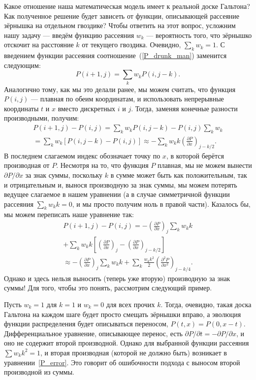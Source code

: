 \documentclass{book}
\begin{document}
Какое отношение наша математическая модель имеет к реальной доске Гальтона? Как полученное решение
будет зависеть от функции, описывающей рассеяние зёрнышка на отдельном гвоздике? Чтобы ответить на
этот вопрос, усложним нашу задачу --- введём функцию рассеяния $w_k$ --- вероятность того, что
зёрнышко отскочит на расстояние $k$ от текущего гвоздика. Очевидно, $\sum_k w_k = 1$. С введением
функции рассеяния соотношение~(\ref{P_drunk_man}) заменится следующим:
\begin{equation}
    \label{advanced_drunk_man}
    P(i+1, j) = \sum_k w_k P(i, j - k).
\end{equation}
Аналогично тому, как мы это делали ранее, мы можем считать, что функция $P(i, j)$ --- плавная по
обеим координатам, и использовать непрерывные координаты $t$ и $x$ вместо дискретных $i$ и $j$.
Тогда, заменяя конечные разности производными, получим:
\begin{multline}
    P(i + 1, j) - P(i, j) = \sum_k w_k P(i, j - k) - P(i, j) \sum_k w_k \\
    = \sum_k w_k \left[ P(i, j - k) - P(i, j) \right] \approx - \sum_k w_k k \left( \frac{\partial
    P}{\partial x} \right)_{j - k/2}.
\end{multline}
В последнем слагаемом индекс обозначает точку по $x$, в которой берётся производная от $P$.
Несмотря на то, что функция $P$ плавная, мы не можем вынести $\partial P / \partial x$ за знак
суммы, поскольку $k$ в сумме может быть как положительным, так и отрицательным и, вынося
производную за знак суммы, мы можем потерять ведущее слагаемое в нашем уравнении (а в
случае симметричной функции рассеяния $\sum_k w_k k = 0$, и мы просто получим ноль в правой части).
Казалось бы, мы можем переписать наше уравнение так:
\begin{multline}
    \label{P_error}
    P(i + 1, j) - P(i, j) = -\left( \frac{\partial P}{\partial x} \right)_j \sum_k w_k k \\
    + \sum_k w_k k \left[ \left( \frac{\partial P}{\partial x} \right)_j - \left( \frac{\partial
    P}{\partial x} \right)_{j - k/2} \right] \\
    \approx - \left( \frac{\partial P}{\partial x} \right)_j \sum_k w_k k + \sum_k \frac{w_k
    k^2}{2} \left( \frac{\partial^2 P}{\partial x^2} \right)_{j - k/4}.
\end{multline}
Однако и здесь нельзя выносить (теперь уже вторую) производную за знак суммы! Для того, чтобы это
понять, рассмотрим следующий пример.

Пусть $w_k = 1$ для $k = 1$ и $w_k = 0$ для всех прочих $k$. Тогда, очевидно, такая доска Гальтона
на каждом шаге будет просто смещать зёрнышки вправо, а эволюция функции распределения будет
описываться переносом, $P(t, x) = P(0, x - t)$. Дифференциальное уравнение, описывающее перенос,
есть $\partial P / \partial t = -\partial P / \partial x$, и оно не содержит второй производной.
Однако для выбранной функции рассеяния $\sum w_k k^2 = 1$, и вторая производная (которой не должно
быть) возникает в уравнении~\ref{P_error}. Это говорит об ошибочности подхода с выносом второй
производной из суммы.
\end{document}
